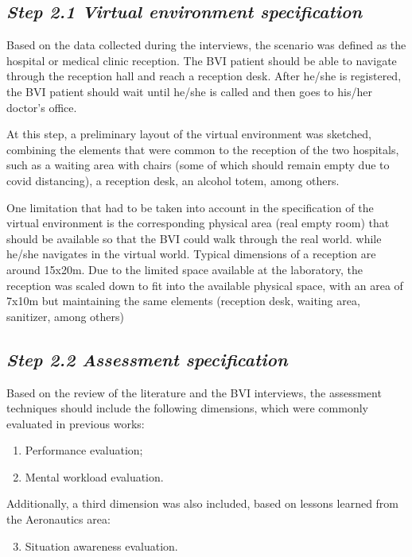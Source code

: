     \subsection*{\textit{Step 2.1 Virtual environment specification}}
        Based on the data collected during the interviews, the scenario was defined as the hospital or medical clinic reception. The BVI patient should be able to navigate through the reception hall and reach a reception desk. After he/she is registered, the BVI patient should wait until he/she is called and then goes to his/her doctor's office.

        At this step, a preliminary layout of the virtual environment was sketched, combining the elements that were common to the reception of the two hospitals, such as a waiting area with chairs (some of which should remain empty due to covid distancing), a reception desk, an alcohol totem, among others.

        One limitation that had to be taken into account in the specification of the virtual environment is the corresponding physical area (real empty room) that should be available so that the BVI could walk through the real world. while he/she navigates in the virtual world. Typical dimensions of a reception are around 15x20m. Due to the limited space available at the laboratory, the reception was scaled down to fit into the available physical space, with an area of 7x10m but maintaining the same elements (reception desk, waiting area, sanitizer, among others)
    

    \subsection*{\textit{Step 2.2 Assessment specification}}
        Based on the review of the literature and the BVI interviews, the assessment techniques should include the following dimensions, which were commonly evaluated in previous works: 

        \begin{enumerate} [label = \Alph*)]
            \item Performance evaluation;
            \item Mental workload evaluation.
        \end{enumerate}
            
        Additionally, a third dimension was also included, based on lessons learned from the Aeronautics area:   

        \begin{enumerate} [label = \Alph*)]
            \setcounter{enumi}{2}
            \item Situation awareness evaluation.
        \end{enumerate}
            
